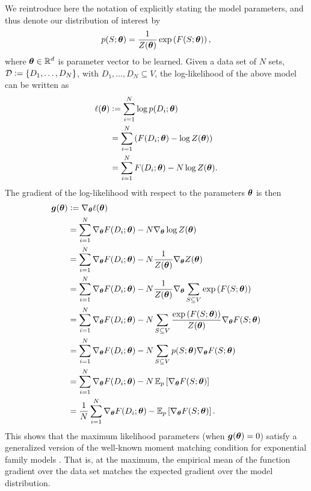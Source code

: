 We reintroduce here the notation of explicitly stating the model parameters, and thus denote our distribution of interest by
\begin{align*}
p(S; \bm{\theta}) = \frac{1}{Z(\bm{\theta})} \exp\left( F(S; \bm{\theta}) \right),
\end{align*}
where $\bm{\theta} \in \mathbb{R}^d$ is parameter vector to be learned.
Given a data set of $N$ sets, $\mathcal{D} \vcentcolon= \{D_1,\ldots,D_N\}$, with $D_1,\ldots,D_N \subseteq V$, the log-likelihood of the above model can be written as
\begin{align*}
\ell(\bm{\theta}) &\vcentcolon= \sum_{i=1}^N \log p(D_i; \bm{\theta})\\
           &= \sum_{i=1}^N \left( F(D_i; \bm{\theta}) - \log Z(\bm{\theta}) \right)\\
           &= \sum_{i=1}^N F(D_i; \bm{\theta}) - N \log Z(\bm{\theta}).
\end{align*}
The gradient of the log-likelihood with respect to the parameters $\bm{\theta}$ is then
\begin{align*}
                 \bm{g}(\bm{\theta}) &\vcentcolon= \nabla_{\bm{\theta}} \ell(\bm{\theta})\\
                              &= \sum_{i=1}^N \nabla_{\bm{\theta}} F(D_i; \bm{\theta}) - N \nabla_{\bm{\theta}} \log Z(\bm{\theta})\\
                              &= \sum_{i=1}^N \nabla_{\bm{\theta}} F(D_i; \bm{\theta}) - N \frac{1}{Z(\bm{\theta})} \nabla_{\bm{\theta}} Z(\bm{\theta})\\
                              &= \sum_{i=1}^N \nabla_{\bm{\theta}} F(D_i; \bm{\theta}) - N \frac{1}{Z(\bm{\theta})} \nabla_{\bm{\theta}} \sum_{S \subseteq V} \exp\left( F(S; \bm{\theta}) \right)\\
                              &= \sum_{i=1}^N \nabla_{\bm{\theta}} F(D_i; \bm{\theta}) - N \sum_{S \subseteq V} \frac{\exp\left( F(S; \bm{\theta})\right)}{Z(\bm{\theta})} \nabla_{\bm{\theta}} F(S; \bm{\theta})\\
                              &= \sum_{i=1}^N \nabla_{\bm{\theta}} F(D_i; \bm{\theta}) - N \sum_{S \subseteq V} p(S; \bm{\theta}) \nabla_{\bm{\theta}} F(S; \bm{\theta})\\
                              &= \sum_{i=1}^N \nabla_{\bm{\theta}} F(D_i; \bm{\theta}) - N\,\mathbb{E}_{p}\left[ \nabla_{\bm{\theta}} F(S; \bm{\theta}) \right]\\
                              &= \frac{1}{N}\sum_{i=1}^N \nabla_{\bm{\theta}} F(D_i; \bm{\theta}) - \mathbb{E}_{p}\left[ \nabla_{\bm{\theta}} F(S; \bm{\theta}) \right].
\end{align*}
This shows that the maximum likelihood parameters (when $\bm{g}(\bm{\theta}) = 0$) satisfy a generalized version of the well-known moment matching condition for exponential family models \citep{wainwright08,koller09}.
That is, at the maximum, the empirical mean of the function gradient over the data set matches the expected gradient over the model distribution.


